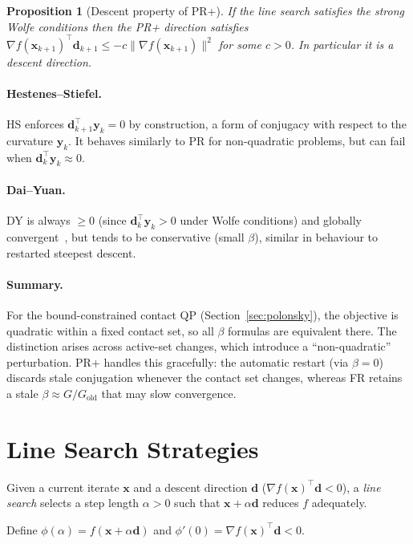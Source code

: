 \documentclass[11pt,a4paper]{article}
\newtheorem{proposition}[theorem]{Proposition}
\newcommand{\bd}{\mathbf{d}}
\newcommand{\bx}{\mathbf{x}}
\newcommand{\by}{\mathbf{y}}
\newcommand{\norm}[1]{\|#1\|}
\newcommand{\tr}{\top}
\begin{document}
\begin{proposition}[Descent property of PR+]
  If the line search satisfies the strong Wolfe conditions then the PR+ direction
  satisfies $\nabla f(\bx_{k+1})^\tr \bd_{k+1} \leq -c\norm{\nabla f(\bx_{k+1})}^2$
  for some $c > 0$.  In particular it is a descent direction.
\end{proposition}

\paragraph{Hestenes--Stiefel.}
HS enforces $\bd_{k+1}^\tr \by_k = 0$ by construction, a form of conjugacy with
respect to the curvature $\by_k$.  It behaves similarly to PR for non-quadratic
problems, but can fail when $\bd_k^\tr\by_k \approx 0$.

\paragraph{Dai--Yuan.}
DY is always $\geq 0$ (since $\bd_k^\tr\by_k > 0$ under Wolfe conditions) and
globally convergent~\cite{DaiYuan1999}, but tends to be conservative (small $\beta$),
similar in behaviour to restarted steepest descent.

\paragraph{Summary.}
For the bound-constrained contact QP (Section~\ref{sec:polonsky}), the objective is
quadratic within a fixed contact set, so all $\beta$ formulas are equivalent there.
The distinction arises across active-set changes, which introduce a ``non-quadratic''
perturbation.  PR+ handles this gracefully: the automatic restart (via $\beta = 0$)
discards stale conjugation whenever the contact set changes, whereas FR retains
a stale $\beta \approx G/G_{\mathrm{old}}$ that may slow convergence.

\section{Line Search Strategies}
\label{sec:linesearch}

Given a current iterate $\bx$ and a descent direction $\bd$
($\nabla f(\bx)^\tr\bd < 0$), a \emph{line search} selects a step length
$\alpha > 0$ such that $\bx + \alpha\bd$ reduces $f$ adequately.

Define $\phi(\alpha) = f(\bx + \alpha\bd)$ and
$\phi'(0) = \nabla f(\bx)^\tr\bd < 0$.
\end{document}
